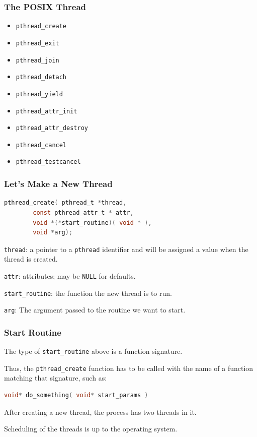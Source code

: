\begin{frame}
	\frametitle{The POSIX Thread}
	\begin{itemize}
		\item \texttt{pthread\_create}
		\item \texttt{pthread\_exit}
		\item \texttt{pthread\_join}
		\item \texttt{pthread\_detach}
		\item \texttt{pthread\_yield}
		\item \texttt{pthread\_attr\_init}
		\item \texttt{pthread\_attr\_destroy}
		\item \texttt{pthread\_cancel}
		\item \texttt{pthread\_testcancel}
	\end{itemize}

\end{frame}


\begin{frame}[fragile]
	\frametitle{Let's Make a New Thread}

	\begin{lstlisting}[language=C]
pthread_create( pthread_t *thread, 
		const pthread_attr_t * attr, 
		void *(*start_routine)( void * ), 
		void *arg);
\end{lstlisting}

	\texttt{thread}: a pointer to a \texttt{pthread} identifier and will be assigned a value when the thread is created.

	\texttt{attr}: attributes; may be \texttt{NULL} for defaults.

	\texttt{start\_routine}: the function the new thread is to run.

	\texttt{arg}: The argument passed to the routine we want to start.

\end{frame}


\begin{frame}[fragile]
	\frametitle{Start Routine}

	The type of \texttt{start\_routine} above is a function signature.

	Thus, the \texttt{pthread\_create} function has to be called with the name of a function matching that signature, such as:

	\begin{lstlisting}[language=C]
void* do_something( void* start_params )
\end{lstlisting}

	After creating a new thread, the process has two threads in it.

	Scheduling of the threads is up to the operating system.

\end{frame}


